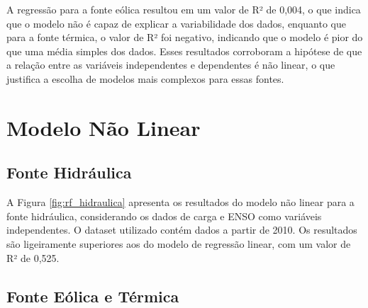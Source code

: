 \begin{figure}[!ht]
  {}
  {}
\end{figure}
\begin{figure}[!ht]
  {}
  {}
\end{figure}

A regressão para a fonte eólica resultou em um valor de R² de 0,004, o que indica que o modelo não é capaz de explicar a 
variabilidade dos dados, enquanto que para a fonte térmica, o valor de R² foi negativo, indicando que o modelo é pior do 
que uma média simples dos dados. Esses resultados corroboram a hipótese de que a relação entre as variáveis independentes 
e dependentes é não linear, o que justifica a escolha de modelos mais complexos para essas fontes.


\section{Modelo Não Linear}
\subsection{Fonte Hidráulica}
\begin{figure}[!ht]
  {}
  {}
\end{figure}
A Figura \ref{fig:rf_hidraulica} apresenta os resultados do modelo não linear para a fonte hidráulica, considerando os dados 
de carga e ENSO como variáveis independentes. O dataset utilizado contém dados a partir de 2010. Os resultados são
ligeiramente superiores aos do modelo de regressão linear, com um valor de R² de 0,525.

\subsection{Fonte Eólica e Térmica}
\begin{figure}[!ht]
  {}
  {}
\end{figure}
\begin{figure}[!ht]
  {}
  {}
\end{figure}

